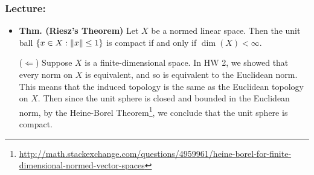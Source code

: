 \documentclass{article}
\begin{document}
\subsubsection{Lecture:}
\begin{itemize}
	\item \textbf{Thm. (Riesz's Theorem)} Let $X$ be a normed linear space. Then the unit ball $\{x \in X: \left\Vert x \right\Vert \leq 1\}$ is compact if and only if $\dim(X) < \infty$.
	
	\begin{solutions}
		($\Leftarrow$) Suppose $X$ is a finite-dimensional space. In HW 2, we showed that every norm on $X$ is equivalent, and so is equivalent to the Euclidean norm. This means that the induced topology is the same as the Euclidean topology on $X$. Then since the unit sphere is closed and bounded in the Euclidean norm, by the Heine-Borel Theorem\footnote{\href{http://math.stackexchange.com/questions/4959961/heine-borel-for-finite-dimensional-normed-vector-spaces}{http://math.stackexchange.com/questions/4959961/heine-borel-for-finite-dimensional-normed-vector-spaces}}, we conclude that the unit sphere is compact. 
		

\end{solutions}
\end{itemize}
\end{document}
